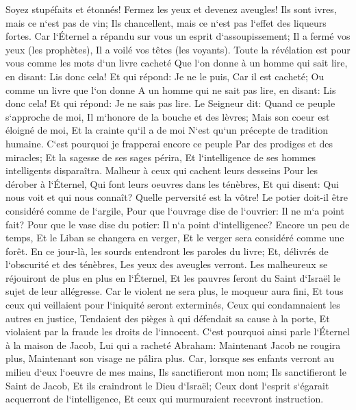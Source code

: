 \verse Soyez stupéfaits et étonnés! Fermez les yeux et devenez aveugles! Ils sont ivres, mais ce n`est pas de vin; Ils chancellent, mais ce n`est pas l`effet des liqueurs fortes. 
\verse Car l`Éternel a répandu sur vous un esprit d`assoupissement; Il a fermé vos yeux (les prophètes), Il a voilé vos têtes (les voyants). 
\verse Toute la révélation est pour vous comme les mots d`un livre cacheté Que l`on donne à un homme qui sait lire, en disant: Lis donc cela! Et qui répond: Je ne le puis, Car il est cacheté; 
\verse Ou comme un livre que l`on donne A un homme qui ne sait pas lire, en disant: Lis donc cela! Et qui répond: Je ne sais pas lire. 
\verse Le Seigneur dit: Quand ce peuple s`approche de moi, Il m`honore de la bouche et des lèvres; Mais son coeur est éloigné de moi, Et la crainte qu`il a de moi N`est qu`un précepte de tradition humaine. 
\verse C`est pourquoi je frapperai encore ce peuple Par des prodiges et des miracles; Et la sagesse de ses sages périra, Et l`intelligence de ses hommes intelligents disparaîtra. 
\verse Malheur à ceux qui cachent leurs desseins Pour les dérober à l`Éternel, Qui font leurs oeuvres dans les ténèbres, Et qui disent: Qui nous voit et qui nous connaît? 
\verse Quelle perversité est la vôtre! Le potier doit-il être considéré comme de l`argile, Pour que l`ouvrage dise de l`ouvrier: Il ne m`a point fait? Pour que le vase dise du potier: Il n`a point d`intelligence? 
\verse Encore un peu de temps, Et le Liban se changera en verger, Et le verger sera considéré comme une forêt. 
\verse En ce jour-là, les sourds entendront les paroles du livre; Et, délivrés de l`obscurité et des ténèbres, Les yeux des aveugles verront. 
\verse Les malheureux se réjouiront de plus en plus en l`Éternel, Et les pauvres feront du Saint d`Israël le sujet de leur allégresse. 
\verse Car le violent ne sera plus, le moqueur aura fini, Et tous ceux qui veillaient pour l`iniquité seront exterminés, 
\verse Ceux qui condamnaient les autres en justice, Tendaient des pièges à qui défendait sa cause à la porte, Et violaient par la fraude les droits de l`innocent. 
\verse C`est pourquoi ainsi parle l`Éternel à la maison de Jacob, Lui qui a racheté Abraham: Maintenant Jacob ne rougira plus, Maintenant son visage ne pâlira plus. 
\verse Car, lorsque ses enfants verront au milieu d`eux l`oeuvre de mes mains, Ils sanctifieront mon nom; Ils sanctifieront le Saint de Jacob, Et ils craindront le Dieu d`Israël; 
\verse Ceux dont l`esprit s`égarait acquerront de l`intelligence, Et ceux qui murmuraient recevront instruction. 

